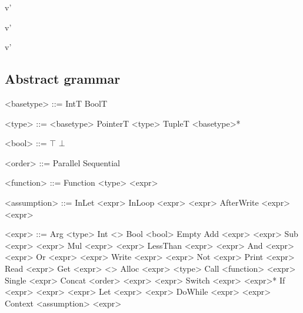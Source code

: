 {\easvsd
  {}{\targ}{\tmem}
  {v}{\tmem'}}

{\easvsd
  {}{\targ}{\tmem}
  {v}{\tmem'}}

{\easvsd
  {}{\targ}{\tmem}
  {v}{\tmem'}}

\newpage
\subsection*{Abstract grammar}
  \begin{minipage}[t]{0.45\linewidth}
    \begin{grammar}
      <basetype> ::= IntT \alt BoolT

      <type> ::= <basetype> \alt PointerT <type> \alt TupleT <basetype>*

      <bool> ::= $\top$ \alt $\bot$

      <order> ::= Parallel \alt Sequential

      <function> ::= Function <type> <expr>

      <assumption> ::= InLet <expr>
      \alt InLoop <expr> <expr>
      \alt AfterWrite <expr> <expr>
    \end{grammar}
  \end{minipage}\hfill%
  \begin{minipage}[t]{0.5\linewidth}
    \begin{grammar}
      <expr> ::= Arg <type>
      \alt Int <\N>
      \alt Bool <bool>
      \alt Empty
      \alt Add <expr> <expr>
      \alt Sub <expr> <expr>
      \alt Mul <expr> <expr>
      \alt LessThan <expr> <expr>
      \alt And <expr> <expr>
      \alt Or <expr> <expr>
      \alt Write <expr> <expr>
      \alt Not <expr>
      \alt Print <expr>
      \alt Read <expr>
      \alt Get <expr> <\N>
      \alt Alloc <expr> <type>
      \alt Call <function> <expr>
      \alt Single <expr>
      \alt Concat <order> <expr> <expr>
      \alt Switch <expr> <expr>*
      \alt If <expr> <expr> <expr>
      \alt Let <expr> <expr>
      \alt DoWhile <expr> <expr>
      \alt Context <assumption> <expr>
    \end{grammar}%
    \end{minipage}%

